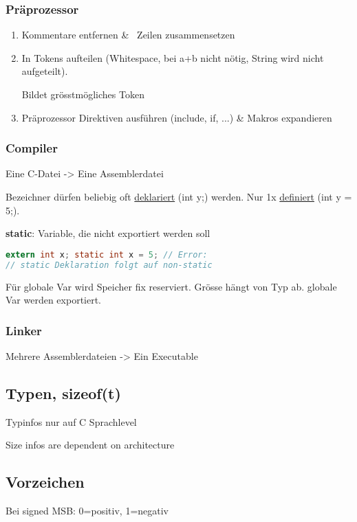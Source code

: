 \begin{multicols*}{4}
\subsubsection{Präprozessor}
\begin{enumerate}
    \item Kommentare entfernen \& \ Zeilen zusammensetzen
    \item In Tokens aufteilen (Whitespace, bei a+b nicht nötig, String wird nicht aufgeteilt).

    Bildet grösstmögliches Token
    \item Präprozessor Direktiven ausführen (include, if, ...)
    \& Makros expandieren

\end{enumerate}


\subsubsection{Compiler}
Eine C-Datei -> Eine Assemblerdatei

Bezeichner dürfen beliebig oft \underline{deklariert} (int y;) werden. Nur 1x \underline{definiert} (int y = 5;).

\textbf{static}: Variable, die nicht exportiert werden soll

\begin{lstlisting}[language=c]
extern int x; static int x = 5; // Error:
// static Deklaration folgt auf non-static
\end{lstlisting}

Für globale Var wird Speicher fix reserviert. Grösse hängt von Typ ab. globale Var werden exportiert.

\subsubsection{Linker}
Mehrere Assemblerdateien -> Ein Executable

\subsection{Typen, sizeof(t)}
Typinfos nur auf C Sprachlevel

Size infos are dependent on architecture

\subsection{Vorzeichen}
Bei signed MSB: 0=positiv, 1=negativ


\end{multicols*}
